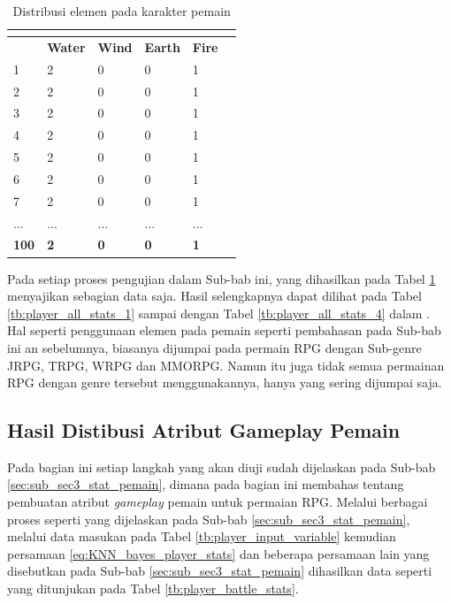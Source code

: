 \begin{longtable}{|l|l|l|l|l|l|}
	\caption{Distribusi elemen pada karakter pemain}
	\vspace{1ex}
	\label{tb:player_element}\\
	\hline
	\rowcolor[HTML]{C0C0C0} 
	\multicolumn{1}{|c|}{\cellcolor[HTML]{C0C0C0}\textbf{Levels}} & \multicolumn{1}{c|}{\cellcolor[HTML]{C0C0C0}\textbf{Water}} & \multicolumn{1}{c|}{\cellcolor[HTML]{C0C0C0}\textbf{Wind}} & \multicolumn{1}{c|}{\cellcolor[HTML]{C0C0C0}\textbf{Earth}} & \multicolumn{1}{c|}{\cellcolor[HTML]{C0C0C0}\textbf{Fire}} \\ \hline
	1 & 2 & 0 & 0 & 1 \\ \hline
	2 & 2 & 0 & 0 & 1 \\ \hline
	3 & 2 & 0 & 0 & 1 \\ \hline
	4 & 2 & 0 & 0 & 1 \\ \hline
	5 & 2 & 0 & 0 & 1 \\ \hline
	6 & 2 & 0 & 0 & 1 \\ \hline
	7 & 2 & 0 & 0 & 1 \\ \hline
	... & ... & ... & ... & ... \\ \hline
	\textbf{100} & \textbf{2} & \textbf{0} & \textbf{0} & \textbf{1} \\ \hline
\end{longtable}

Pada setiap proses pengujian dalam Sub-bab ini, yang dihasilkan pada Tabel \ref{tb:player_element} menyajikan sebagian data saja. Hasil selengkapnya dapat dilihat pada Tabel \ref{tb:player_all_stats_1} sampai dengan Tabel \ref{tb:player_all_stats_4} dalam . Hal seperti penggunaan elemen pada pemain seperti pembahasan pada Sub-bab ini an sebelumnya, biasanya dijumpai pada permain RPG dengan Sub-genre JRPG, TRPG, WRPG dan MMORPG. Namun itu juga tidak semua permainan RPG dengan genre tersebut menggunakannya, hanya yang sering dijumpai saja.
\vspace{1ex}

\subsection{Hasil Distibusi Atribut Gameplay Pemain}
\label{sec:sub_sec4_eval_single-character_stats}
\vspace{1ex}

Pada bagian ini setiap langkah yang akan diuji sudah dijelaskan pada Sub-bab \ref{sec:sub_sec3_stat_pemain}, dimana pada bagian ini membahas tentang pembuatan atribut \textit{gameplay} pemain untuk permaian RPG. Melalui berbagai proses seperti yang dijelaskan pada Sub-bab \ref{sec:sub_sec3_stat_pemain}, melalui data masukan pada Tabel \ref{tb:player_input_variable} kemudian persamaan \ref{eq:KNN_bayes_player_stats} dan beberapa persamaan lain yang disebutkan pada Sub-bab \ref{sec:sub_sec3_stat_pemain} dihasilkan data seperti yang ditunjukan pada Tabel \ref{tb:player_battle_stats}.
\vspace{-1ex}

